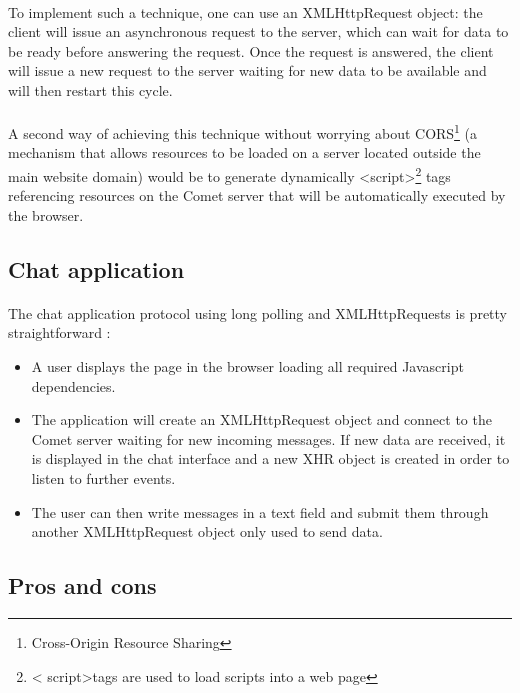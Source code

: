 \paragraph{} To implement such a technique, one can use an XMLHttpRequest 
object: the client will issue an asynchronous request to the server, which can 
wait for data to be ready before answering the request. Once the request is 
answered, the client will issue a new request to the server waiting for new 
data 
to be available and will then restart this cycle.

\paragraph{} A second way of achieving this technique without worrying about 
CORS\footnote{Cross-Origin Resource Sharing} (a mechanism that allows resources 
to be loaded on a server located outside the main website domain) would be to 
generate dynamically \textless script\textgreater \footnote{ \textless 
script\textgreater tags are used to load scripts into a web page} tags 
referencing resources on the Comet server that will be automatically executed 
by the browser.

\subsection{Chat application}

\paragraph{} The chat application protocol using long 
polling and XMLHttpRequests is pretty straightforward : 

\begin{itemize}
 \item A user displays the page in the browser loading all required Javascript 
dependencies.
 \item The application will create an XMLHttpRequest object and connect to the 
Comet server waiting for new incoming messages. If new data are received, 
it is displayed in the chat interface and a new XHR object is created in order 
to listen to further events.
 \item The user can then write messages in a text field and submit them through 
another XMLHttpRequest object only used to send data.
\end{itemize}

\subsection{Pros and cons}


